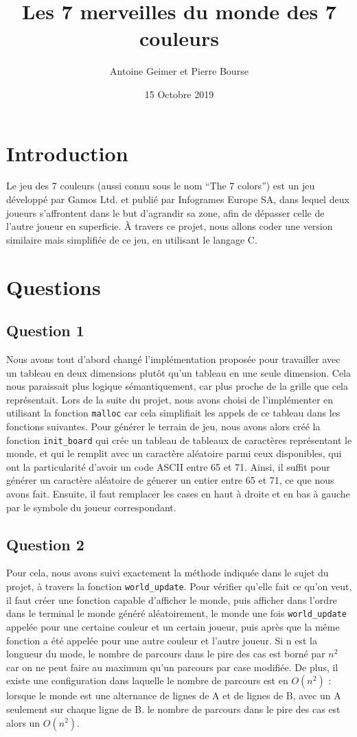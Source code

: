 \documentclass{article}
\title{Les 7 merveilles du monde des 7 couleurs}
\date{15 Octobre 2019}
\author{Antoine Geimer et Pierre Bourse}
\begin{document}
\maketitle

\section{Introduction}
    \quad Le jeu des 7 couleurs (aussi connu sous le nom \enquote{The 7 colors}) est un jeu développé par Gamos Ltd. et publié par Infogrames Europe SA, dans lequel deux joueurs s'affrontent dans le but d'agrandir sa zone, afin de dépasser celle de l'autre joueur en superficie. À travers ce projet, nous allons coder une version similaire mais simplifiée de ce jeu, en utilisant le langage C.
\section{Questions}
\subsection{Question 1}
    Nous avons tout d'abord changé l'implémentation proposée pour travailler avec un tableau en deux dimensions plutôt qu'un tableau en une seule dimension. Cela nous paraissait plus logique sémantiquement, car plus proche de la grille que cela représentait. Lors de la suite du projet, nous avons choisi de l'implémenter en utilisant la fonction \texttt{malloc} car cela simplifiait les appels de ce tableau dans les fonctions suivantes. Pour générer le terrain de jeu, nous avons alors créé la fonction \texttt{init\_board} qui crée un tableau de tableaux de caractères représentant le monde, et qui le remplit avec un caractère aléatoire parmi ceux disponibles, qui ont la particularité d'avoir un code ASCII entre 65 et 71. Ainsi, il suffit pour générer un caractère aléatoire de génerer un entier entre 65 et 71, ce que nous avons fait. Ensuite, il faut remplacer les cases en haut à droite et en bas à gauche par le symbole du joueur correspondant.
\subsection{Question 2}
    Pour cela, nous avons suivi exactement la méthode indiquée dans le sujet du projet, à travers la fonction \texttt{world\_update}. Pour vérifier qu'elle fait ce qu'on veut, il faut créer une fonction capable d'afficher le monde, puis afficher dans l'ordre dans le terminal le monde généré aléatoirement, le monde une fois \texttt{world\_update} appelée pour une certaine couleur et un certain joueur, puis après que la même fonction a été appelée pour une autre couleur et l'autre joueur. Si n est la longueur du mode, le nombre de parcours dans le pire des cas est borné par $n^2$ car on ne peut faire au maximum qu'un parcours par case modifiée. De plus, il existe une configuration dans laquelle le nombre de parcours est en $O(n^2)$ : lorsque le monde est une alternance de lignes de A et de lignes de B, avec un A seulement sur chaque ligne de B. le nombre de parcours dans le pire des cas est alors un $O(n^2)$.
\end{document}
